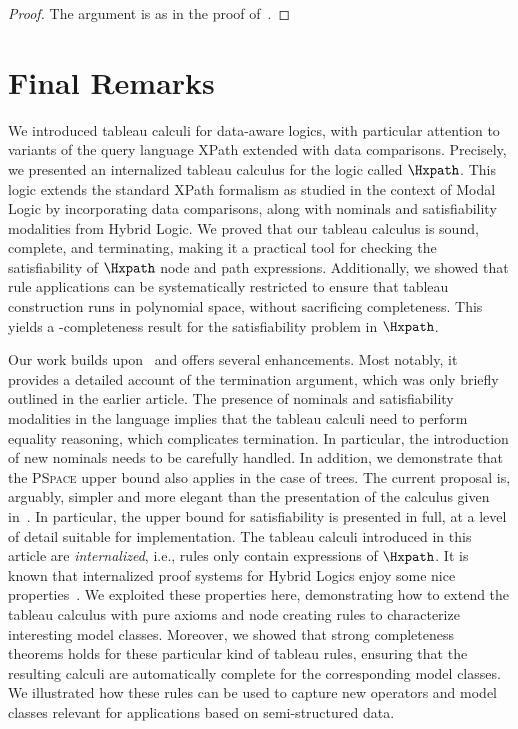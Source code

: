 \documentclass[10pt,a4paper]{amsart}
\theoremstyle{definition}
\theoremstyle{remark}
\begin{document}
\begin{proof}
The argument is as in the proof of~.
\end{proof}

\section{Final Remarks}
\label{sec:final}

We introduced tableau calculi for data-aware logics, with particular attention to variants of the query language XPath extended with data comparisons. Precisely, we presented an internalized tableau calculus for the logic called $\Hxpath$. This logic extends the standard XPath formalism as studied in the context of Modal Logic by incorporating data comparisons, along with nominals and satisfiability modalities from Hybrid Logic.
We proved that our tableau calculus is sound, complete, and terminating, making it a practical tool for checking the satisfiability of $\Hxpath$ node and path expressions. Additionally, we showed that rule applications can be systematically restricted to ensure that tableau construction runs in polynomial space, without sacrificing completeness. This yields a \pspace-completeness result for the satisfiability problem in $\Hxpath$.

Our work builds upon~\cite{ArecesFS17} and offers several enhancements. Most notably, it provides a detailed account of the termination argument, which was only briefly outlined in the earlier article. The presence of nominals and satisfiability modalities in the language implies that the tableau calculi need to perform equality reasoning, which complicates termination. In particular, the introduction of new nominals needs to be carefully handled.  In addition, we demonstrate that the \textsc{PSpace} upper bound also applies in the case of trees.
The current proposal is, arguably, simpler and more elegant than the presentation of the calculus given in~\cite{ArecesFS17}.  In particular, the \pspace upper bound for satisfiability is presented in full, at a level of detail suitable for implementation. The tableau calculi introduced in this article are \emph{internalized}, i.e., rules only contain expressions of $\Hxpath$. It is known that internalized proof systems for Hybrid Logics enjoy some nice properties~\cite{Blackburn00,Blackburn2002BeyondPA}. We exploited these properties here, demonstrating how to extend the tableau calculus with pure axioms and node creating rules to characterize interesting model classes. Moreover, we showed that strong completeness theorems holds for these particular kind of tableau rules, ensuring that the resulting calculi are automatically complete for the corresponding model classes.  We illustrated how these rules can be used to capture new operators and model classes relevant for applications based on semi-structured data. 
\end{document}

